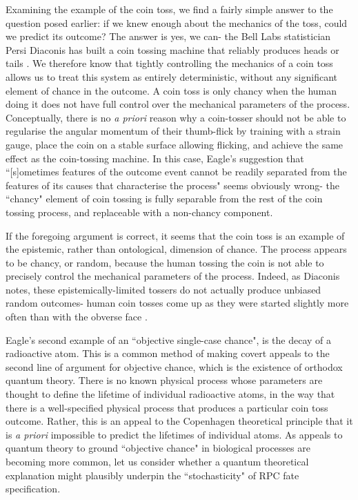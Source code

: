 Examining the example of the coin toss, we find a fairly simple answer to the question posed earlier: if we knew enough about the mechanics of the toss, could we predict its outcome? The answer is yes, we can- the Bell Labs statistician Persi Diaconis has built a coin tossing machine that reliably produces heads or tails \cite{Kestenbaum2004}. We therefore know that tightly controlling the mechanics of a coin toss allows us to treat this system as entirely deterministic, without any significant element of chance in the outcome. A coin toss is only chancy when the human doing it does not have full control over the mechanical parameters of the process. Conceptually, there is no \textit{a priori} reason why a coin-tosser should not be able to regularise the angular momentum of their thumb-flick by training with a strain gauge, place the coin on a stable surface allowing flicking, and achieve the same effect as the coin-tossing machine. In this case, Eagle's suggestion that ``[s]ometimes features of the outcome event cannot be readily separated from the features of its causes that characterise the process" seems obviously wrong- the ``chancy" element of coin tossing is fully separable from the rest of the coin tossing process, and replaceable with a non-chancy component.

If the foregoing argument is correct, it seems that the coin toss is an example of the epistemic, rather than ontological, dimension of chance. The process appears to be chancy, or random, because the human tossing the coin is not able to precisely control the mechanical parameters of the process. Indeed, as Diaconis notes, these epistemically-limited tossers do not actually produce unbiased random outcomes- human coin tosses come up as they were started slightly more often than with the obverse face \cite{Diaconis2007}.

Eagle's second example of an ``objective single-case chance", is the decay of a radioactive atom. This is a common method of making covert appeals to the second line of argument for objective chance, which is the existence of orthodox quantum theory. There is no known physical process whose parameters are thought to define the lifetime of individual radioactive atoms, in the way that there is a well-specified physical process that produces a particular coin toss outcome. Rather, this is an appeal to the Copenhagen theoretical principle that it is \textit{a priori} impossible to predict the lifetimes of individual atoms. As appeals to quantum theory to ground ``objective chance" in biological processes are becoming more common, let us consider whether a quantum theoretical explanation might plausibly underpin the ``stochasticity" of RPC fate specification.

